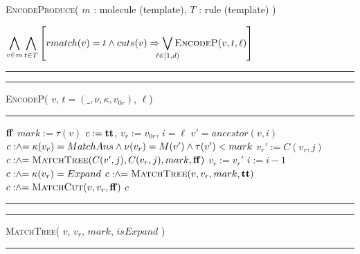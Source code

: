 \begin{algorithm}[h!]
  \caption{\textsc{EncodeProduce}( $m$ : molecule (template), $T$ : rule (template) )}
  \label{alg:produce}
  \begin{algorithmic}[1]
    \State \Return $\displaystyle
    \Land_{v\in m}
    \Land_{t \in T}
    \left[
      rmatch(v) = t \land cuts(v) \limplies \Lor_{ \mathclap{\ell \in [1,d)}} \textsc{EncodeP}( v, t, \ell)
      \right]
      $
  \end{algorithmic}
  \hrule
  \vspace{2ex}
  \hrule\vspace{2pt}
  \textsc{EncodeP}( $v$, $t = (\_,\nu,\kappa,v_{0r})$, $\ell$)\hfill\mbox{}
  \vspace{2pt}\hrule
  \begin{algorithmic}[1]
     \quad \Return $\mathbf{ff}$
    \EndIf
    \State $mark := \tau(v)$\; $c := \mathbf{tt}$, \; $v_r := v_{0r}$, \; $i = \ell$
    \label{line:encodep-while}
    \State $v' = ancestor(v,i)$
    \State $c \mathrel{:\hspace{-3pt}\land\hspace{-3pt}=}  \kappa(v_r) = MatchAns \land \nu(v_r) = M(v') \land \tau(v') < mark$
    \label{line:encodep-ans-match}
    \label{line:encodep-sub-for-loop}
       \label{line:encodep-jth-child-cond}
       \State $v_r' := C(v_r, j)$ 
       \label{line:encodep-next-vr}
    \Else
       \State $c \mathrel{:\hspace{-3pt}\land\hspace{-3pt}=} \textsc{MatchTree}(C(v',j), C(v_r, j),mark, \mathbf{ff})$
       \label{line:mtree}
    \EndIf
    \EndFor
    \State $v_r := v_r'$
    \label{line:encodep-update-vr}
    \State $i := i - 1$
    \EndWhile
    \label{line:encodep-end-whileloop}
    \State $c \mathrel{:\hspace{-3pt}\land\hspace{-3pt}=}  \kappa(v_r) = Expand$
    \label{line:encodep-vr-expand}
    \State $c \mathrel{:\hspace{-3pt}\land\hspace{-3pt}=}  \textsc{MatchTree}(v, v_r,mark,\mathbf{tt}) $
    \label{line:encodep-mtree-expand}
    \State $c \mathrel{:\hspace{-3pt}\land\hspace{-3pt}=}  \textsc{MatchCut}(v, v_r,\mathbf{ff})
    $\label{line:mcut}
    \State \Return $c$
  \end{algorithmic}
  \hrule
  \vspace{2ex}
  \hrule\vspace{2pt}
  \textsc{MatchTree}( $v$, $v_r$, $mark$, $isExpand$ )\hfill\mbox{}
  \vspace{2pt}\hrule
  \begin{algorithmic}[1]

\end{algorithmic}
\end{algorithm}
